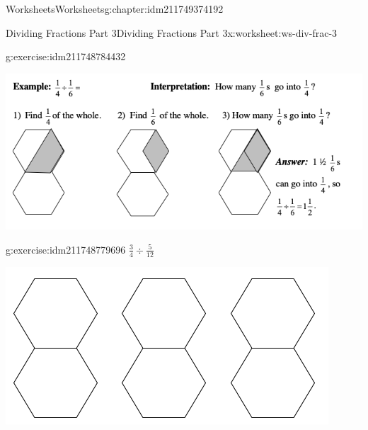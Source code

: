 \documentclass[twoside,11pt,]{book}
\begin{document}
\begin{chapterptx}{Worksheets}{}{Worksheets}{}{}{g:chapter:idm211749374192}
\begin{worksheet-section-numberless}{Dividing Fractions Part 3}{}{Dividing Fractions Part 3}{}{}{x:worksheet:ws-div-frac-3}
\begin{divisionexercise}{2}{}{}{g:exercise:idm211748784432}
\begin{sidebyside}{1}{0.15}{0.15}{0}
\begin{sbspanel}{0.7}
\end{sbspanel}%
\end{sidebyside}%
\end{divisionexercise}%
\clearpage
\begin{introduction}{}%
\begin{sidebyside}{1}{0}{0}{0}%
\begin{sbspanel}{1}%
\includegraphics[width=1\linewidth]{images/frac-div-hex-3.png}
\end{sbspanel}%
\end{sidebyside}%
\end{introduction}%
\begin{divisionexercise}{3}{}{}{g:exercise:idm211748779696}%
\(\frac{3}{4} \div \frac{5}{12} \)%
\begin{sidebyside}{1}{0.15}{0.15}{0}%
\begin{sbspanel}{0.7}%
\includegraphics[width=1\linewidth]{images/3-double-hexagons.png}
\end{sbspanel}%
\end{sidebyside}%
\end{divisionexercise}%
\end{worksheet-section-numberless}
\restoregeometry
%
%
\typeout{************************************************}
\typeout{************************************************}

\end{chapterptx}
\end{document}
